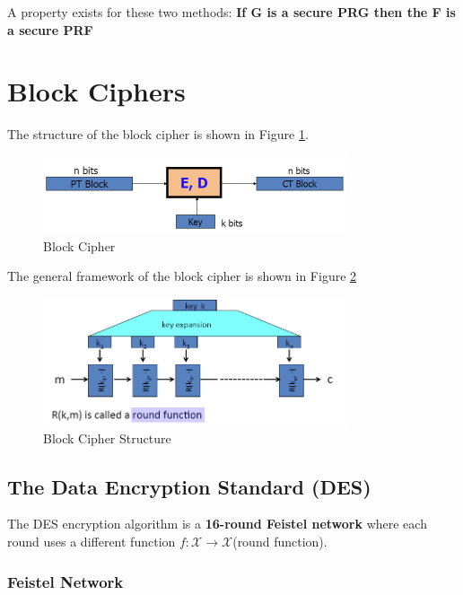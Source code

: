 A property exists for these two methods: \textbf{If G is a secure PRG then the F is a secure PRF}


\section{Block Ciphers}

The structure of the block cipher is shown in Figure \ref{fig: 03 Block Cipher}.

\begin{figure}[h]
    \centering
    \includegraphics[width=0.8\textwidth]{Stanford_Crypto_1/fig/03_block_cipher/Block Cipher.png}
    \caption{Block Cipher}
    \label{fig: 03 Block Cipher}
\end{figure}

The general framework of the block cipher is shown in Figure \ref{fig: 03 Block Cipher Structure}

\begin{figure}[h]
    \centering
    \includegraphics[width=0.8\textwidth]{Stanford_Crypto_1/fig/03_block_cipher/Block Cipher Structure.png}
    \caption{Block Cipher Structure}
    \label{fig: 03 Block Cipher Structure}
\end{figure}

\subsection{The Data Encryption Standard (DES)}

    The DES encryption algorithm is a \textbf{16-round Feistel network} where each round uses a different function $f: \mathcal{X} \rightarrow \mathcal{X}$(round function).

\subsubsection{Feistel Network}

